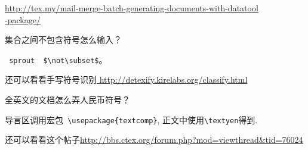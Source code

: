 \documentclass[QAofGroup.tex]{subfiles}
\begin{document}
 \href{http://tex.my/mail-merge-batch-generating-documents-with-datatool-package/}%
 {http://tex.my/mail-merge-batch-generating-documents-with-datatool\\-package/}

\begin{qst}\label{Q2018010806}
 集合之间不包含符号怎么输入？
\end{qst}
\ans \verb| sprout  $\not\subset$|。

还可以看看手写符号识别\url{ http://detexify.kirelabs.org/classify.html}

\begin{qst}\label{Q2018010807}
全英文的文档怎么弄人民币符号？
\end{qst}
\ans 导言区调用宏包\verb| \usepackage{textcomp}|, 正文中使用\verb|\textyen|得到\textyen.

还可以看看这个帖子\url{http://bbs.ctex.org/forum.php?mod=viewthread&tid=76024}
\end{document}

